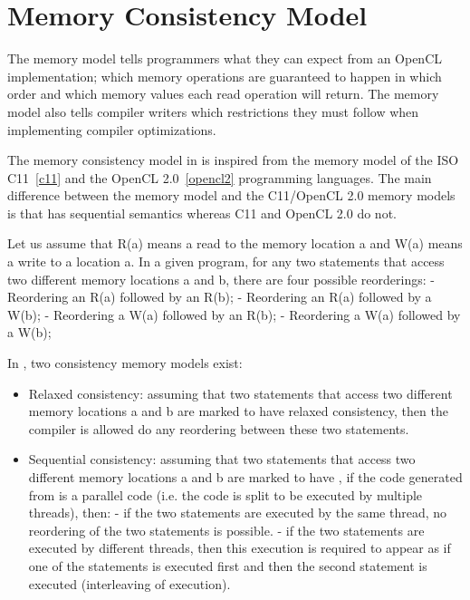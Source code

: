 \section{Memory Consistency Model}


The \pencil memory model tells programmers what they can expect from an OpenCL
implementation; which memory operations are guaranteed to happen in which order
and which memory values each read operation will return.
The memory model also tells compiler writers which restrictions they must follow
when implementing compiler optimizations.

The memory consistency model in \pencil is inspired from the memory model of
the ISO C11~\ref{c11} and the OpenCL 2.0~\ref{opencl2} programming languages.
The main difference between the \pencil memory model and the C11/OpenCL 2.0
memory models is that \pencil has sequential semantics whereas C11 and OpenCL
2.0 do not.

Let us assume that R(a) means a read to the memory location a and W(a) means
a write to a location a.
In a given program, for any two statements that access two different memory
locations a and b, there are four possible reorderings:
- Reordering an R(a) followed by an R(b);
- Reordering an R(a) followed by a  W(b);
- Reordering a  W(a) followed by an R(b);
- Reordering a  W(a) followed by a  W(b);

In \pencil, two consistency memory models exist:
\begin{itemize}
  \item Relaxed consistency: assuming that two statements that access two
  different memory locations a and b are marked to have relaxed consistency,
  then the compiler is allowed do any reordering between these
  two statements.
  \item Sequential consistency: assuming that two statements that access two
  different memory locations a and b are marked to have , if the code generated from \pencil is a parallel code
  (i.e. the code is split to be executed by multiple threads), then:
 	- if the two statements are executed by the same thread,
 	no reordering of the two statements is possible.
  	- if the two statements are executed by different threads, then this
  	execution is required to appear as if one of the statements is executed
  	first and then the second statement is executed (interleaving
  	of execution).
\end{itemize}

